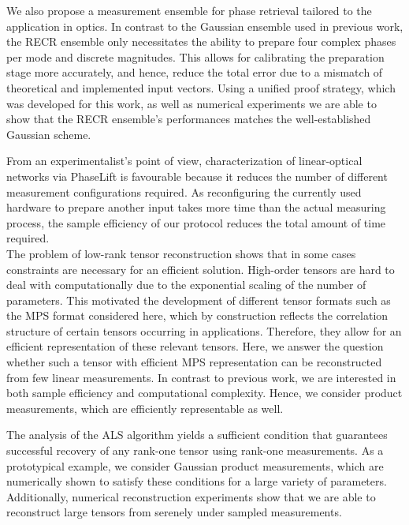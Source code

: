 We also propose a measurement ensemble for phase retrieval tailored to the application in optics.
In contrast to the Gaussian ensemble used in previous work, the RECR ensemble only necessitates the ability to prepare four complex phases per mode and discrete magnitudes.
This allows for calibrating the preparation stage more accurately, and hence, reduce the total error due to a mismatch of theoretical and implemented input vectors.
Using a unified proof strategy, which was developed for this work, as well as numerical experiments we are able to show that the RECR ensemble's performances matches the well-established Gaussian scheme.

From an experimentalist's point of view, characterization of linear-optical networks via PhaseLift is favourable because it reduces the number of different measurement configurations required.
As reconfiguring the currently used hardware to prepare another input takes more time than the actual measuring process, the sample efficiency of our protocol reduces the total amount of time required.\\



The problem of low-rank tensor reconstruction shows that in some cases constraints are necessary for an efficient solution.
High-order tensors are hard to deal with computationally due to the exponential scaling of the number of parameters.
This motivated the development of different tensor formats such as the MPS format considered here, which by construction reflects the correlation structure of certain tensors occurring in applications.
Therefore, they allow for an efficient representation of these relevant tensors.
Here, we answer the question whether such a tensor with efficient MPS representation can be reconstructed from few linear measurements.
In contrast to previous work, we are interested in both sample efficiency and computational complexity.
Hence, we consider product measurements, which are efficiently representable as well.

The analysis of the ALS algorithm yields a sufficient condition that guarantees successful recovery of any rank-one tensor using rank-one measurements.
As a prototypical example, we consider Gaussian product measurements, which are numerically shown to satisfy these conditions for a large variety of parameters.
Additionally, numerical reconstruction experiments show that we are able to reconstruct large tensors from serenely under sampled measurements.


